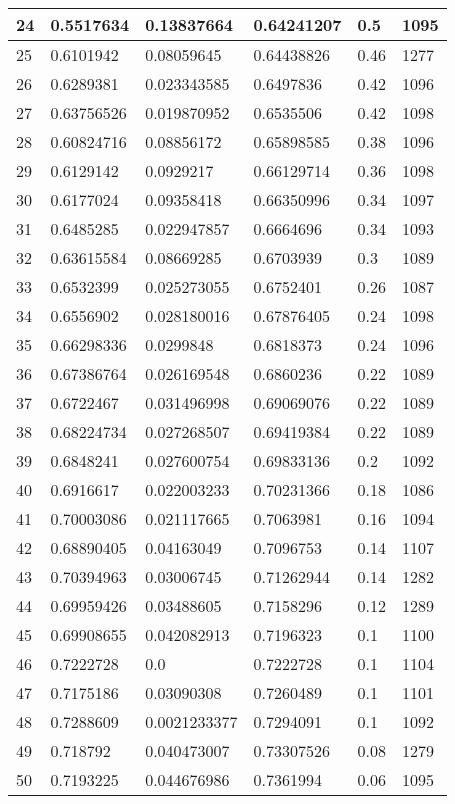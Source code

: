 \begin{longtable}{|l|l|l|l|l|l|}
24 & 0.5517634 & 0.13837664 & 0.64241207 & 0.5 & 1095 \\ \hline 
25 & 0.6101942 & 0.08059645 & 0.64438826 & 0.46 & 1277 \\ \hline 
26 & 0.6289381 & 0.023343585 & 0.6497836 & 0.42 & 1096 \\ \hline 
27 & 0.63756526 & 0.019870952 & 0.6535506 & 0.42 & 1098 \\ \hline 
28 & 0.60824716 & 0.08856172 & 0.65898585 & 0.38 & 1096 \\ \hline 
29 & 0.6129142 & 0.0929217 & 0.66129714 & 0.36 & 1098 \\ \hline 
30 & 0.6177024 & 0.09358418 & 0.66350996 & 0.34 & 1097 \\ \hline 
31 & 0.6485285 & 0.022947857 & 0.6664696 & 0.34 & 1093 \\ \hline 
32 & 0.63615584 & 0.08669285 & 0.6703939 & 0.3 & 1089 \\ \hline 
33 & 0.6532399 & 0.025273055 & 0.6752401 & 0.26 & 1087 \\ \hline 
34 & 0.6556902 & 0.028180016 & 0.67876405 & 0.24 & 1098 \\ \hline 
35 & 0.66298336 & 0.0299848 & 0.6818373 & 0.24 & 1096 \\ \hline 
36 & 0.67386764 & 0.026169548 & 0.6860236 & 0.22 & 1089 \\ \hline 
37 & 0.6722467 & 0.031496998 & 0.69069076 & 0.22 & 1089 \\ \hline 
38 & 0.68224734 & 0.027268507 & 0.69419384 & 0.22 & 1089 \\ \hline 
39 & 0.6848241 & 0.027600754 & 0.69833136 & 0.2 & 1092 \\ \hline 
40 & 0.6916617 & 0.022003233 & 0.70231366 & 0.18 & 1086 \\ \hline 
41 & 0.70003086 & 0.021117665 & 0.7063981 & 0.16 & 1094 \\ \hline 
42 & 0.68890405 & 0.04163049 & 0.7096753 & 0.14 & 1107 \\ \hline 
43 & 0.70394963 & 0.03006745 & 0.71262944 & 0.14 & 1282 \\ \hline 
44 & 0.69959426 & 0.03488605 & 0.7158296 & 0.12 & 1289 \\ \hline 
45 & 0.69908655 & 0.042082913 & 0.7196323 & 0.1 & 1100 \\ \hline 
46 & 0.7222728 & 0.0 & 0.7222728 & 0.1 & 1104 \\ \hline 
47 & 0.7175186 & 0.03090308 & 0.7260489 & 0.1 & 1101 \\ \hline 
48 & 0.7288609 & 0.0021233377 & 0.7294091 & 0.1 & 1092 \\ \hline 
49 & 0.718792 & 0.040473007 & 0.73307526 & 0.08 & 1279 \\ \hline 
50 & 0.7193225 & 0.044676986 & 0.7361994 & 0.06 & 1095 \\ \hline 
\end{longtable}